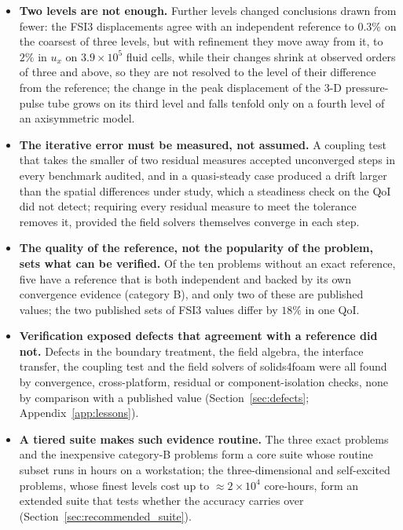 \documentclass[sn-mathphys,Numbered]{sn-jnl}%
\begin{document}
\begin{itemize}
	\item \textbf{Two levels are not enough.} Further levels changed conclusions drawn from fewer: the FSI3 displacements agree with an independent reference to $0.3\%$ on the coarsest of three levels, but with refinement they move away from it, to $2\%$ in $u_x$ on $3.9\times10^5$ fluid cells, while their changes shrink at observed orders of three and above, so they are not resolved to the level of their difference from the reference; the change in the peak displacement of the 3-D pressure-pulse tube grows on its third level and falls tenfold only on a fourth level of an axisymmetric model.
	\item \textbf{The iterative error must be measured, not assumed.} A coupling test that takes the smaller of two residual measures accepted unconverged steps in every benchmark audited, and in a quasi-steady case produced a drift larger than the spatial differences under study, which a steadiness check on the QoI did not detect; requiring every residual measure to meet the tolerance removes it, provided the field solvers themselves converge in each step.
	\item \textbf{The quality of the reference, not the popularity of the problem, sets what can be verified.} Of the ten problems without an exact reference, five have a reference that is both independent and backed by its own convergence evidence (category B), and only two of these are published values; the two published sets of FSI3 values differ by $18\%$ in one QoI.
	\item \textbf{Verification exposed defects that agreement with a reference did not.} Defects in the boundary treatment, the field algebra, the interface transfer, the coupling test and the field solvers of solids4foam were all found by convergence, cross-platform, residual or component-isolation checks, none by comparison with a published value (Section~\ref{sec:defects}; Appendix~\ref{app:lessons}).
	\item \textbf{A tiered suite makes such evidence routine.} The three exact problems and the inexpensive category-B problems form a core suite whose routine subset runs in hours on a workstation; the three-dimensional and self-excited problems, whose finest levels cost up to $\approx2\times10^{4}$ core-hours, form an extended suite that tests whether the accuracy carries over (Section~\ref{sec:recommended_suite}).
\end{itemize}
\end{document}
